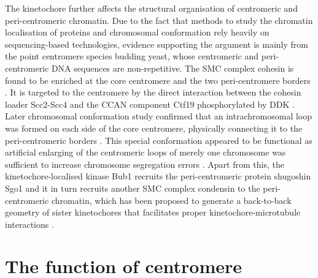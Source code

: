 The kinetochore further affects the structural organisation of centromeric and peri-centromeric chromatin. Due to the fact that methods to study the chromatin localisation of proteins and chromosomal conformation rely heavily on sequencing-based technologies, evidence supporting the argument is mainly from the point centromere species budding yeast, whose centromeric and peri-centromeric DNA sequences are non-repetitive. The SMC complex cohesin is found to be enriched at the core centromere and the two peri-centromere borders \citep{Eckert2007TheTension, Fernius2009EstablishmentCsm3, Fernius2013Cohesin-DependentEstablishment, Glynn2004Genome-WideCerevisiae, Weber2004TheBinding}. It is targeted to the centromere by the direct interaction between the cohesin loader Scc2-Scc4 and the CCAN component Ctf19 phosphorylated by DDK \citep{Hinshaw2015StructuralLoading, Hinshaw2017TheComplex}. Later chromosomal conformation study confirmed that an intrachromosomal loop was formed on each side of the core centromere, physically connecting it to the peri-centromeric borders \citep{Paldi2020ConvergentPericentromeres}. This special conformation appeared to be functional as artificial enlarging of the centromeric loops of merely one chromosome was sufficient to increase chromosome segregation errors \citep{Paldi2020ConvergentPericentromeres}. Apart from this, the kinetochore-localised kinase Bub1 recruits the peri-centromeric protein shugoshin Sgo1 and it in turn recruits another SMC complex condensin to the peri-centromeric chromatin, which has been proposed to generate a back-to-back geometry of sister kinetochores that facilitates proper kinetochore-microtubule interactions \citep{Indjeian2007, Verzijlbergen2014}. 


\section{The function of centromere}
\label{chapter 1 section 1.3}

